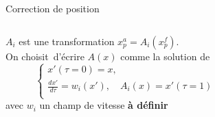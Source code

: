 \documentclass[aspectratio=169]{beamer} %
\begin{document}
\begin{frame}{Correction de position}
    \begin{columns}[t]
        \begin{column}{0.6\textwidth}
            $A_i$ est une transformation $x^a_{p} = A_i(x^f_{p})$. \\
            On choisit~\footnotemark[1] d'écrire $A(x)$ comme la solution de\\
            \begin{equation*}
                \begin{cases}
                    x'(\tau = 0) = x,                                           \\
                    \frac{d x'}{d \tau} = w_i (x'), \quad A_i(x) = x'(\tau = 1) \\
                \end{cases}
            \end{equation*}avec $w_i$ un champ de vitesse \textbf{à définir}
        \end{column}
        \begin{column}{0.4\textwidth}
            \vspace{-2cm}
            \begin{figure}
                \centering

\end{figure}
\end{column}
\end{columns}
\end{frame}
\end{document}
